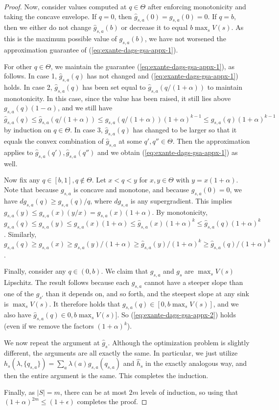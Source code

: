\begin{proof}
  Now, consider values computed at $q \in \Theta$ after enforcing monotonicity and taking the concave envelope.
  If $q=0$, then $\hat{g}_{s,a}(0) = g_{s,a}(0) = 0$.
  If $q=b$, then we either do not change $\hat{g}_{s,a}(b)$ or decrease it to equal $b \max_s V(s)$.
  As this is the maximum possible value of $g_{s,a}(b)$, we have not worsened the approximation guarantee of (\ref{eq:exante-dags-gsa-appx-1}).

  For other $q \in \Theta$, we maintain the guarantee (\ref{eq:exante-dags-gsa-appx-1}), as follows.
  In case 1, $\hat{g}_{s,a}(q)$ has not changed and (\ref{eq:exante-dags-gsa-appx-1}) holds.
  In case 2, $\hat{g}_{s,a}(q)$ has been set equal to $\hat{g}_{s,a}(q/(1+\alpha))$ to maintain monotonicity.
  In this case, since the value has been raised, it still lies above $g_{s,a}(q)(1-\alpha)$, and we still have $\hat{g}_{s,a}(q) \leq \hat{g}_{s,a}(q/(1+\alpha)) \leq g_{s,a}(q/(1+\alpha))(1+\alpha)^{k-1}  \leq g_{s,a}(q)(1+\alpha)^{k-1}$ by induction on $q \in \Theta$.
  In case 3, $\hat{g}_{s,a}(q)$ has changed to be larger so that it equals the convex combination of $\hat{g}_{s,a}$ at some $q',q'' \in \Theta$.
  Then the approximation applies to $\hat{g}_{s,a}(q'), \hat{g}_{s,a}(q'')$ and we obtain (\ref{eq:exante-dags-gsa-appx-1}) as well.

  Now fix any $q \in [b,1], q \not\in \Theta$.
  Let $x < q < y$ for $x,y \in \Theta$ with $y = x(1+\alpha)$.
  Note that because $g_{s,a}$ is concave and monotone, and because $g_{s,a}(0) = 0$, we have $dg_{s,a}(q) \geq g_{s,a}(q)/q$, where $dg_{s,a}$ is any supergradient.
  This implies $g_{s,a}(y) \leq g_{s,a}(x)(y/x) = g_{s,a}(x)(1+\alpha)$.
  By monotonicity, $g_{s,a}(q) \leq g_{s,a}(y) \leq g_{s,a}(x)(1+\alpha) \leq \hat{g}_{s,a}(x)(1+\alpha)^k \leq \hat{g}_{s,a}(q)(1+\alpha)^k$.
  Similarly, $g_{s,a}(q) \geq g_{s,a}(x) \geq g_{s,a}(y)/(1+\alpha) \geq \hat{g}_{s,a}(y)/(1+\alpha)^k \geq \hat{g}_{s,a}(q)/(1+\alpha)^k$.

  Finally, consider any $q \in (0,b)$.
  We claim that $g_{s,a}$ and $g_s$ are $\max_s V(s)$ Lipschitz.
  The result follows because each $g_{s,a}$ cannot have a steeper slope than one of the $g_{s'}$ than it depends on, and so forth, and the steepest slope at any sink is $\max_s V(s)$.
  It therefore holds that $g_{s,a}(q) \in [0, b \max_s V(s)]$, and we also have $\hat{g}_{s,a}(q) \in 0, b \max_s V(s)]$.
  So (\ref{eq:exante-dags-gsa-appx-2}) holds (even if we remove the factors $(1+\alpha)^k$).

  We now repeat the argument at $\hat{g}_s$.
  Although the optimization problem is slightly different, the arguments are all exactly the same.
  In particular, we just utilize $h_{s}(\lambda,\{q_{s,a}\}) = \sum_a \lambda(a) g_{s,a}(q_{s,a})$ and $\hat{h}_s$ in the exactly analogous way, and then the entire argument is the same.
  This completes the induction.
  
  Finally, as $|S|=m$, there can be at most $2m$ levels of induction, so using that $(1+\alpha)^{2m} \leq (1+\epsilon)$ completes the proof.
\end{proof}

